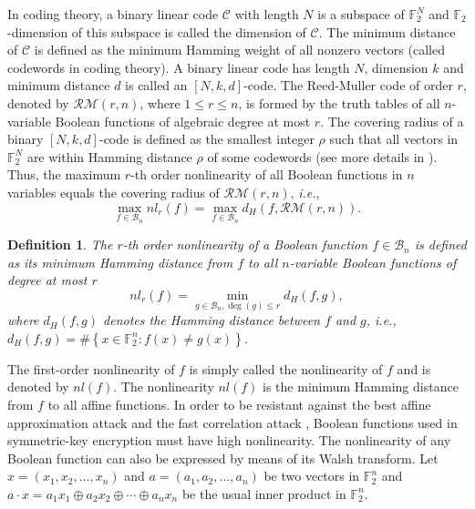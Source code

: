 \documentclass{article}
\newcommand{\F}{\mathbb{F}}
\newcommand{\0}{\textbf{0}}
\newcommand{\1}{\textbf{1}}
\theoremstyle{plain}
\newtheorem{definition}{Definition}
\begin{document}
    In coding theory, a binary linear code $\mathcal{C}$ with length $N$ is a subspace of $\F_2^N$ and $\F_2$-dimension of this subspace is called the dimension of $\mathcal{C}$.
    The minimum distance of $\mathcal{C}$ is defined as the minimum Hamming weight of all nonzero vectors (called codewords in coding theory).
    A binary linear code has length $N$, dimension $k$ and minimum distance $d$ is called an $\left[ N,k,d \right]$-code.
    The Reed-Muller code of order $r$, denoted by $\mathcal{RM}(r,n)$, where $1\le r\le n$, is formed by the truth tables of all $n$-variable Boolean functions of algebraic degree at most $r$. The covering radius of a binary $\left[ N,k,d \right]$-code is defined as the smallest integer $\rho$ such that all
    vectors in $\F_2^N$ are within Hamming distance $\rho$ of some codewords (see more details in \cite{MS1977}).
    Thus, the maximum $r$-th order nonlinearity of all Boolean functions in $n$ variables equals the covering radius of $\mathcal{RM}(r,n)$, \emph{i.e.},
    \[\max_{f\in \mathcal{B}_n}nl_r(f)=\max_{f\in\mathcal{B}_n}d_H(f,\mathcal{RM}(r,n)).\]
    \begin{definition}
        The $r$-th order nonlinearity of a Boolean function $f\in\mathcal{B}_n$ is defined as its minimum Hamming distance from $f$ to all $n$-variable Boolean functions of degree at most $r$
        \[nl_r(f)=\min_{g\in\mathcal{B}_n,\deg(g)\le r} d_H(f,g),\]
        where $d_H(f,g)$ denotes the Hamming distance between $f$ and $g$, i.e., $d_H(f,g)=\#\left\{ x\in\F_2^n : f(x)\ne g(x) \right\}$.
    \end{definition}
    The first-order nonlinearity of $f$ is simply called the nonlinearity of $f$ and is denoted by $nl(f)$.
    The nonlinearity $nl(f)$ is the minimum Hamming distance from $f$ to all affine functions.
    In order to be resistant against the best affine approximation attack \cite{DingXS1991book} and the fast correlation attack \cite{MS1988fast_correlation_attack}, Boolean functions used in symmetric-key encryption must have high nonlinearity.
    The nonlinearity of any Boolean function can also be expressed by means of its Walsh transform.
    Let $x=(x_1,x_2,\dots,x_n)$ and $a=(a_1,a_2,\dots,a_n)$ be two vectors in $\F_2^n$ and $a\cdot x=a_1x_1\oplus a_2x_2\oplus\cdots\oplus a_nx_n$ be the usual inner product in $\F_2^n$.
\end{document}
